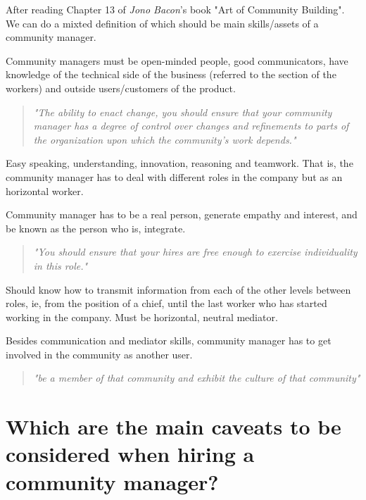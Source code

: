 \documentclass[11pt]{scrartcl}
\begin{document}
\par After reading Chapter 13 of \emph{Jono Bacon}'s book "Art of Community Building". We can do a mixted definition of which should be main skills/assets of a community manager. 

\par Community managers must be open-minded people, good communicators, have knowledge of the technical side of the business (referred to the section of the workers) and outside users/customers of the product.

\begin{quote}
    \emph{"The ability to enact change, you should ensure that your community manager has a degree of control over changes and refinements to parts of the organization upon which the community’s work depends."}
\end{quote}

\par Easy speaking, understanding, innovation, reasoning and teamwork. That is, the community manager has to deal with different roles in the company but as an horizontal worker.

\par Community manager has to be a real person, generate empathy and interest, and be known as the person who is, integrate.

\begin{quote}
    \emph{"You should ensure that your hires are free enough to exercise individuality in this role."}
\end{quote}

\par Should know how to transmit information from each of the other levels between roles, ie, from the position of a chief, until the last worker who has started working in the company. Must be horizontal, neutral mediator.

\par Besides communication and mediator skills, community manager has to get involved in the community as another user. 

\begin{quote}
    \emph{"be a member of that community and exhibit the culture of that community"}
\end{quote}


\section{Which are the main caveats to be considered when hiring a community manager?}
\label{sec:main-caveats}
\end{document}
